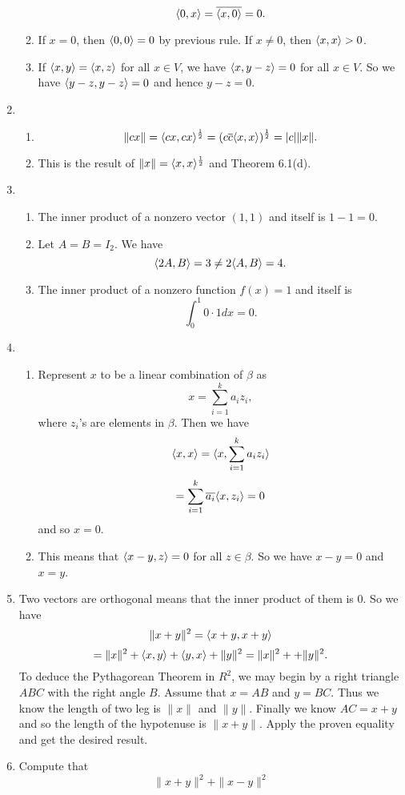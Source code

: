 \begin{enumerate}
\begin{enumerate}
\[\langle 0,x\rangle =\overline{\langle x,0\rangle }=0.\]
\item If $x=0$, then $\langle 0,0\rangle =0$ by previous rule. If $x\neq 0$, then $\langle x,x\rangle >0$.
\item If $\langle x,y\rangle =\langle x,z\rangle $ for all $x\in V$, we have $\langle x,y-z\rangle =0$ for all $x\in V$. So we have $\langle y-z,y-z\rangle =0$ and hence $y-z=0$.
\end{enumerate}
\item \begin{enumerate}
\item \[\|cx\|=\langle cx,cx\rangle ^{\frac{1}{2}}=(c\overline{c}\langle x,x\rangle)^{\frac{1}{2}}=|c|\|x\|.\]
\item This is the result of $\|x\|=\langle x,x\rangle^{\frac{1}{2}}$ and Theorem 6.1(d).
\end{enumerate}
\item \begin{enumerate}
\item The inner product of a nonzero vector $(1,1)$ and itself is $1-1=0$.
\item Let $A=B=I_2$. We have 
\[\langle 2A,B\rangle=3\neq 2\langle A,B\rangle =4.\]
\item The inner product of a nonzero function $f(x)=1$ and itself is 
\[\int_0^1{0\cdot 1dx}=0.\]
\end{enumerate}
\item \begin{enumerate}
\item Represent $x$ to be a linear combination of $\beta$ as 
\[x=\sum_{i=1}^k{a_iz_i},\]
where $z_i$'s are elements in $\beta$. Then we have 
\[\langle x,x\rangle =\langle x,\sum_{i=1}^k{a_iz_i}\rangle \]
\[=\sum_{i=1}^k{\overline{a_i}\langle x,z_i\rangle}=0\]
and so $x=0$.
\item This means that $\langle x-y,z\rangle =0$ for all $z\in \beta$. So we have $x-y=0$ and $x=y$.
\end{enumerate}
\item Two vectors are orthogonal means that the inner product of them is $0$. So we have 
\[\|x+y\|^2=\langle x+y,x+y\rangle \]
\[=\|x\|^2+\langle x,y\rangle +\langle y,x\rangle +\|y\|^2=\|x\|^2+ +\|y\|^2.\]
To deduce the Pythagorean Theorem in $R^2$, we may begin by a right triangle $ABC$ with the right angle $B$. Assume that $x=AB$ and $y=BC$. Thus we know the length of two leg is $\|x\|$ and $\|y\|$. Finally we know $AC=x+y$ and so the length of the hypotenuse is $\|x+y\|$. Apply the proven equality and get the desired result.
\item Compute that 
\[\|x+y\|^2+\|x-y\|^2\]

\end{enumerate}
